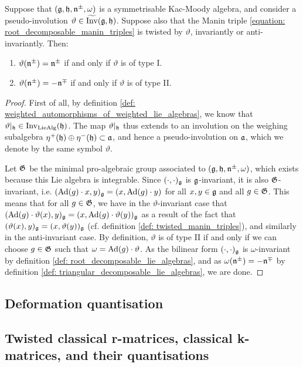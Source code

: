         \begin{proposition} \label{prop: twisted_manin_triples_of_types_I_and_II}
            Suppose that $(\mathfrak{g}, \mathfrak{h}, \mathfrak{n}^{\pm}, \omega)$ is a symmetrisable Kac-Moody algebra, and consider a pseudo-involution $\vartheta \in \widetilde{\operatorname{Inv}}(\mathfrak{g}, \mathfrak{h})$. Suppose also that the Manin triple \eqref{equation: root_decomposable_manin_triples} is twisted by $\vartheta$, invariantly or anti-invariantly. Then:
            \begin{enumerate}
                \item $\vartheta(\mathfrak{n}^{\pm}) = \mathfrak{n}^{\pm}$ if and only if $\vartheta$ is of type I.
                \item $\vartheta(\mathfrak{n}^{\pm}) = -\mathfrak{n}^{\mp}$ if and only if $\vartheta$ is of type II.
            \end{enumerate}
        \end{proposition}
            \begin{proof}
                First of all, by definition \ref{def: weighted_automorphisms_of_weighted_lie_algebras}, we know that $\vartheta|_{\mathfrak{h}} \in \operatorname{Inv}_{\mathrm{Lie}\mathrm{Alg}}(\mathfrak{h})$. The map $\vartheta|_{\mathfrak{h}}$ thus extends to an involution on the weighing subalgebra $\eta^+(\mathfrak{h}) \oplus \eta^-(\mathfrak{h}) \subset \mathfrak{a}$, and hence a pseudo-involution on $\mathfrak{a}$, which we denote by the same symbol $\vartheta$.
            
                Let $\mathfrak{G}$ be the minimal pro-algebraic group associated to $(\mathfrak{g}, \mathfrak{h}, \mathfrak{n}^{\pm}, \omega)$, which exists because this Lie algebra is integrable. Since $(\cdot, \cdot)_{\mathfrak{g}}$ is $\mathfrak{g}$-invariant, it is also $\mathfrak{G}$-invariant, i.e. $(\mathrm{Ad}(g) \cdot x, y)_{\mathfrak{g}} = (x, \mathrm{Ad}(g) \cdot y)$ for all $x, y \in \mathfrak{g}$ and all $g \in \mathfrak{G}$. This means that for all $g \in \mathfrak{G}$, we have in the $\vartheta$-invariant case that $( \mathrm{Ad}(g) \cdot \vartheta(x), y )_{\mathfrak{g}} = ( x, \mathrm{Ad}(g) \cdot \vartheta(y) )_{\mathfrak{g}}$ as a result of the fact that $( \vartheta(x), y )_{\mathfrak{g}} = ( x, \vartheta(y) )_{\mathfrak{g}}$ (cf. definition \ref{def: twisted_manin_triples}), and similarly in the anti-invariant case. By definition, $\vartheta$ is of type II if and only if we can choose $g \in \mathfrak{G}$ such that $\omega = \mathrm{Ad}(g) \cdot \vartheta$.  As the bilinear form $(\cdot, \cdot)_{\mathfrak{g}}$ is $\omega$-invariant by definition \ref{def: root_decomposable_lie_algebras}, and as $\omega(\mathfrak{n}^{\pm}) = -\mathfrak{n}^{\mp}$ by definition \ref{def: triangular_decomposable_lie_algebras}, we are done.
            \end{proof}

    \subsection{Deformation quantisation}

    \subsection{Twisted classical r-matrices, classical k-matrices, and their quantisations}